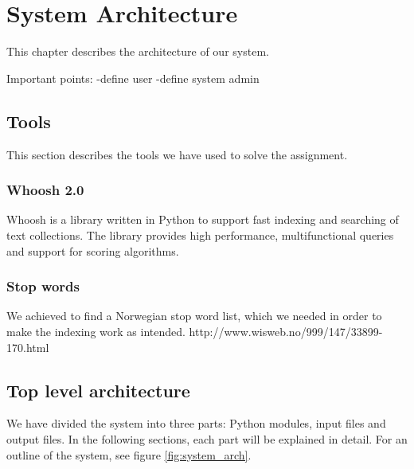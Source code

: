 \chapter{System Architecture}
This chapter describes the architecture of our system.

Important points:
-define user
-define system admin

\section{Tools}
This section describes the tools we have used to solve the assignment. 

\subsection{Whoosh 2.0}
Whoosh is a library written in Python to support fast indexing and searching of text collections. The library provides high performance, multifunctional queries and support for scoring algorithms.

\subsection{Stop words}
We achieved to find a Norwegian stop word list, which we needed in order to make the indexing work as intended.
http://www.wisweb.no/999/147/33899-170.html

\section{Top level architecture}
We have divided the system into three parts: Python modules, input files and output files. In the following sections, each part will be explained in detail. For an outline of the system, see figure \ref{fig:system_arch}.

